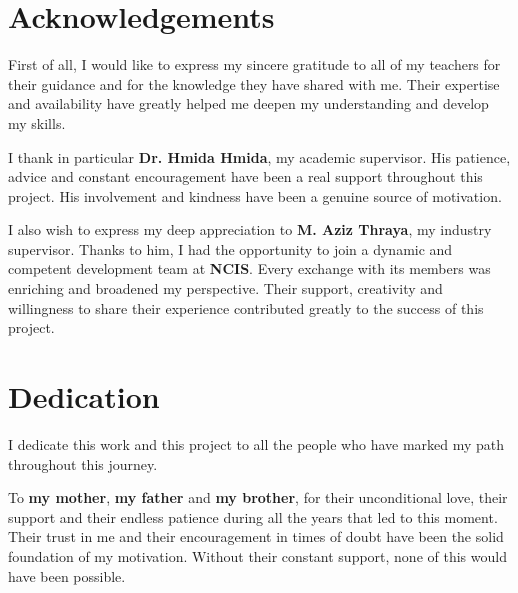 \documentclass[12pt,a4paper,oneside]{report}
\begin{document}

\setcounter{page}{1}


\clearpage
\normalsize

\chapter*{Acknowledgements}
\thispagestyle{plain}

First of all, I would like to express my sincere gratitude to all of my teachers for their guidance and for the knowledge they have shared with me. Their expertise and availability have greatly helped me deepen my understanding and develop my skills.

I thank in particular \textbf{Dr. Hmida Hmida}, my academic supervisor. His patience, advice and constant encouragement have been a real support throughout this project. His involvement and kindness have been a genuine source of motivation.

I also wish to express my deep appreciation to \textbf{M. Aziz Thraya}, my industry supervisor. Thanks to him, I had the opportunity to join a dynamic and competent development team at \textbf{NCIS}. Every exchange with its members was enriching and broadened my perspective. Their support, creativity and willingness to share their experience contributed greatly to the success of this project.

\chapter*{Dedication}
\thispagestyle{plain}

I dedicate this work and this project to all the people who have marked my path throughout this journey.

To \textbf{my mother}, \textbf{my father} and \textbf{my brother}, for their unconditional love, their support and their endless patience during all the years that led to this moment. Their trust in me and their encouragement in times of doubt have been the solid foundation of my motivation. Without their constant support, none of this would have been possible.
\end{document}
